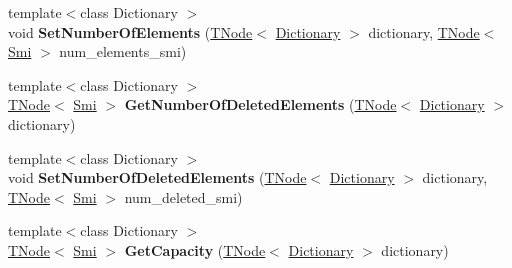 \begin{DoxyCompactItemize}
\item 
\mbox{\label{classv8_1_1internal_1_1CodeStubAssembler_a6ee102577541d844bb8e4478cbd3cdb9}} 
{\footnotesize template$<$class Dictionary $>$ }\\void {\bfseries Set\+Number\+Of\+Elements} (\mbox{\hyperlink{classv8_1_1internal_1_1compiler_1_1TNode}{T\+Node}}$<$ \mbox{\hyperlink{classv8_1_1internal_1_1Dictionary}{Dictionary}} $>$ dictionary, \mbox{\hyperlink{classv8_1_1internal_1_1compiler_1_1TNode}{T\+Node}}$<$ \mbox{\hyperlink{classv8_1_1internal_1_1Smi}{Smi}} $>$ num\+\_\+elements\+\_\+smi)
\item 
\mbox{\label{classv8_1_1internal_1_1CodeStubAssembler_aad9ba5164aaeae771cbce23ca3a11a83}} 
{\footnotesize template$<$class Dictionary $>$ }\\\mbox{\hyperlink{classv8_1_1internal_1_1compiler_1_1TNode}{T\+Node}}$<$ \mbox{\hyperlink{classv8_1_1internal_1_1Smi}{Smi}} $>$ {\bfseries Get\+Number\+Of\+Deleted\+Elements} (\mbox{\hyperlink{classv8_1_1internal_1_1compiler_1_1TNode}{T\+Node}}$<$ \mbox{\hyperlink{classv8_1_1internal_1_1Dictionary}{Dictionary}} $>$ dictionary)
\item 
\mbox{\label{classv8_1_1internal_1_1CodeStubAssembler_a308a264be40970373d09fbc78e5af8b4}} 
{\footnotesize template$<$class Dictionary $>$ }\\void {\bfseries Set\+Number\+Of\+Deleted\+Elements} (\mbox{\hyperlink{classv8_1_1internal_1_1compiler_1_1TNode}{T\+Node}}$<$ \mbox{\hyperlink{classv8_1_1internal_1_1Dictionary}{Dictionary}} $>$ dictionary, \mbox{\hyperlink{classv8_1_1internal_1_1compiler_1_1TNode}{T\+Node}}$<$ \mbox{\hyperlink{classv8_1_1internal_1_1Smi}{Smi}} $>$ num\+\_\+deleted\+\_\+smi)
\item 
\mbox{\label{classv8_1_1internal_1_1CodeStubAssembler_a2f48ecd881e754f88c2a6728af3325ae}} 
{\footnotesize template$<$class Dictionary $>$ }\\\mbox{\hyperlink{classv8_1_1internal_1_1compiler_1_1TNode}{T\+Node}}$<$ \mbox{\hyperlink{classv8_1_1internal_1_1Smi}{Smi}} $>$ {\bfseries Get\+Capacity} (\mbox{\hyperlink{classv8_1_1internal_1_1compiler_1_1TNode}{T\+Node}}$<$ \mbox{\hyperlink{classv8_1_1internal_1_1Dictionary}{Dictionary}} $>$ dictionary)

\end{DoxyCompactItemize}
